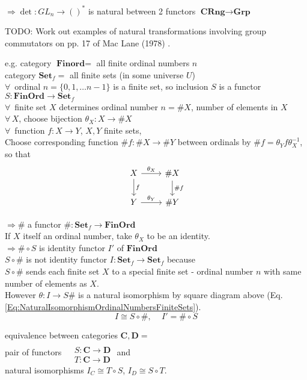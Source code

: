 \documentclass[10pt]{amsart}
\begin{document}
\begin{multicols*}{2}
$\Longrightarrow \det : GL_n \to ()^*$ is natural between 2 functors $\textbf{CRng} \to \textbf{Grp}$

TODO: Work out examples of natural transformations involving group commutators on pp. 17 of Mac Lane (1978) \cite{MacL1978}.

e.g. category $\textbf{Finord} = $ all finite ordinal numbers $n$ \\
category $\textbf{Set}_f = $ all finite sets (in some universe $U$) \\ 
$\forall \, $ ordinal $n = \lbrace 0 , 1 , \dots n-1 \rbrace$ is a finite set, so inclusion $S$ is a functor $S: \textbf{FinOrd} \to \textbf{Set}_f$ \\
$\forall \, $ finite set $X$ determines ordinal number $n = \# X$, number of elements in $X$ \\
$\forall \, X$, choose bijection $\theta_X:X \to \# X$ \\
$\forall \, $ function $f:X \to Y$, $X,Y$ finite sets, \\
Choose corresponding function $\# f : \# X \to \# Y$ between ordinals by $\# f = \theta_Y f \theta_X^{-1}$, so that 
\begin{equation}\label{Eq:NaturalIsomorphismOrdinalNumbersFiniteSets}
\begin{tikzcd}
X \arrow{d}{f} \arrow{r}{\theta_X} & \# X \arrow{d}{\# f} \\
Y \arrow{r}{\theta_Y} & \# Y
\end{tikzcd}
\end{equation}

$\Longrightarrow \# $ a functor $\# : \textbf{Set}_f \to \textbf{FinOrd}$ \\
If $X$ itself an ordinal number, take $\theta_X$ to be an identity. \\
$\Longrightarrow \# \circ S$ is identity functor $I'$ of $\textbf{FinOrd}$ \\
$S \circ \#$ is not identity functor $I : \textbf{Set}_f \to \textbf{Set}_f$ because \\
$S \circ \#$ sends each finite set $X$ to a special finite set - ordinal number $n$ with same number of elements as $X$. \\
However $\theta: I \to S \#$ is a natural isomorphism by square diagram above (Eq. \ref{Eq:NaturalIsomorphismOrdinalNumbersFiniteSets}).  
\[
I \cong S\circ \# , \quad \, I' = \# \circ S 
\]

equivalence between categories $\mathbf{C}, \mathbf{D} =$ \\
pair of functors $\begin{aligned} & \quad \\ 
& S : \mathbf{C} \to \mathbf{D} \\ 
& T : \mathbf{C} \to \mathbf{D} \end{aligned}$ and \\
natural isomorphisms $I_C \cong T \circ S$, $I_D \cong S \circ T$. 






\end{multicols*}
\end{document}
